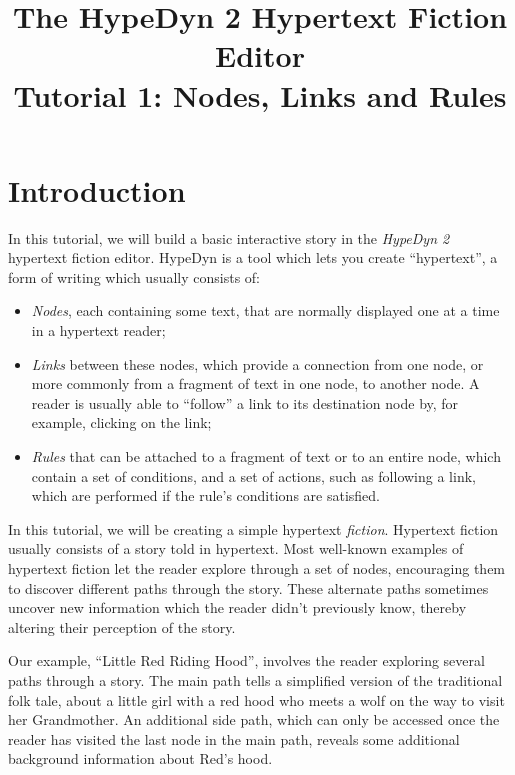 \documentclass{article}
\begin{document}
\title{The HypeDyn 2 Hypertext Fiction Editor\\Tutorial 1: Nodes, Links and Rules}
\date{}

\onecolumn
\maketitle

\tableofcontents


\section{Introduction}
In this tutorial, we will build a basic interactive story in the \textit{HypeDyn 2} hypertext fiction editor. HypeDyn is a tool which lets you create ``hypertext'', a form of writing which usually consists of:

\begin{itemize}
  \item \textit{Nodes}, each containing some text, that
  are normally displayed one at a time in a hypertext reader;
  \item \textit{Links} between these nodes, which provide a connection from one node, or more commonly from a fragment of text in one node, to another node. A reader is usually able to ``follow'' a link to its destination node by, for example, clicking on the link; 
  \item \textit{Rules} that can be attached to a fragment of text or to an entire node, which contain a set of conditions, and a set of actions, such as following a link, which are performed if the rule's conditions are satisfied.
\end{itemize}

In this tutorial, we will be creating a simple hypertext \textit{fiction}. Hypertext fiction usually consists of a story told in hypertext. Most well-known examples of hypertext fiction let the reader explore through a set of nodes, encouraging them to discover different paths through the story. These alternate paths sometimes uncover new information which the reader didn't previously know, thereby altering their perception of the story.

Our example, ``Little Red Riding Hood'', involves the reader exploring several paths through a story. The main path tells a simplified version of the traditional folk tale, about a little girl with a red hood who meets a wolf on the way to visit her Grandmother. An additional side path, which can only be accessed once the reader has visited the last node in the main path, reveals some additional background information about Red's hood.
\end{document}
